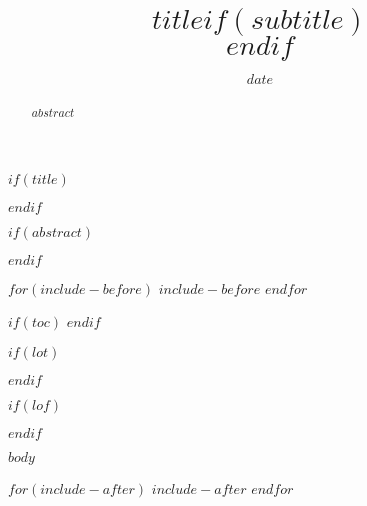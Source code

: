 \documentclass[11pt,a4paper]{article}
\title{$title$$if(subtitle)$\\\vspace{0.5em}{\large $subtitle$}$endif$}
\author{\FZLiuKai{$for(author)$$author$$sep$ \and $endfor$}}
\date{$date$}
\begin{document}
$if(title)$
  \maketitle
$endif$

$if(abstract)$
  \begin{abstract}
    $abstract$
  \end{abstract}
$endif$

$for(include-before)$
  $include-before$
$endfor$

$if(toc)$
{
  \hypersetup{linkcolor=black}
  \setcounter{tocdepth}{$toc-depth$}
  \tableofcontents
}
$endif$

$if(lot)$
  \listoftables
$endif$

$if(lof)$
  \listoffigures
$endif$

$body$

$for(include-after)$
  $include-after$
$endfor$
\end{document}
